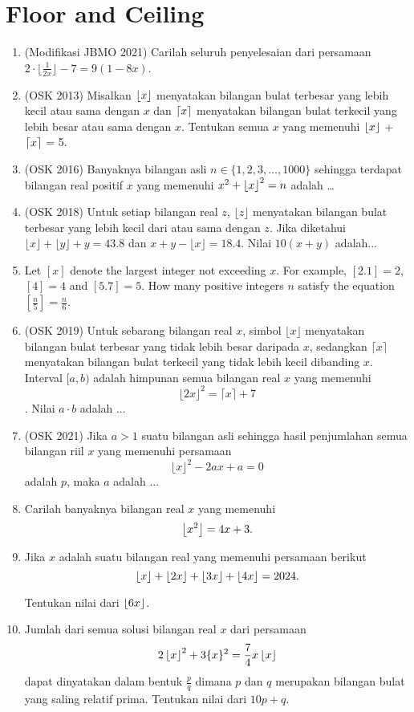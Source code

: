 \documentclass[11pt]{scrartcl}
\begin{document}
\section{Floor and Ceiling}
\begin{enumerate}
    \item (Modifikasi JBMO 2021) Carilah seluruh penyelesaian dari persamaan $2\cdot \lfloor{\frac{1}{2x}}\rfloor - 7 = 9(1 - 8x)$.

    \item (OSK 2013) Misalkan $\left\lfloor x \right\rfloor$ menyatakan bilangan bulat terbesar yang lebih kecil atau sama dengan $x$ dan $\left\lceil x \right\rceil$ menyatakan bilangan bulat terkecil yang lebih besar atau sama dengan $x$. Tentukan semua $x$ yang memenuhi $\left\lfloor x \right\rfloor$ + $\left\lceil x \right\rceil$ = 5.
    
    \item (OSK 2016) Banyaknya bilangan asli $n \in \{1,2,3,\dots,1000\}$ sehingga terdapat bilangan real positif $x$ yang memenuhi $x^2+\left\lfloor x \right\rfloor^2=n$ adalah \dots
    
    \item (OSK 2018) Untuk setiap bilangan real $z$, $\lfloor z \rfloor$ menyatakan bilangan bulat terbesar yang lebih kecil dari atau sama dengan $z$. Jika diketahui $\lfloor x \rfloor + \lfloor y \rfloor + y = 43.8$ dan $x + y - \lfloor x \rfloor = 18.4$. Nilai $10(x + y)$ adalah...
    
    \item Let $[x]$ denote the largest integer not exceeding $x$. For example, $[2.1]=2$, $[4]=4$ and $[5.7]=5$. How many positive integers $n$ satisfy the equation $\left[\frac{n}{5}\right]=\frac{n}{6}$.

    \item (OSK 2019) Untuk sebarang bilangan real $x$, simbol $\lfloor x \rfloor$ menyatakan bilangan bulat terbesar yang tidak lebih besar daripada $x$, sedangkan $\lceil x \rceil$ menyatakan bilangan bulat terkecil yang tidak lebih kecil dibanding $x$. Interval $[a, b)$ adalah himpunan semua bilangan real $x$ yang memenuhi
    $$\lfloor 2x \rfloor^2 = \lceil x \rceil + 7$$.
    Nilai $a \cdot b$ adalah ...

    \item (OSK 2021) Jika $a > 1$ suatu bilangan asli sehingga hasil penjumlahan semua bilangan riil $x$ yang memenuhi persamaan
    $$\lfloor x \rfloor^2 - 2ax + a = 0$$
    adalah $p$, maka $a$ adalah ...

    \item Carilah banyaknya bilangan real $x$ yang memenuhi
    $$\left\lfloor x^2 \right\rfloor=4x+3.$$

    \item Jika $x$ adalah suatu bilangan real yang memenuhi persamaan berikut
    $$\left\lfloor x \right\rfloor+\left\lfloor 2x \right\rfloor+\left\lfloor 3x \right\rfloor+\left\lfloor 4x \right\rfloor=2024.$$

    Tentukan nilai dari $\left\lfloor 6x \right\rfloor$.

    \item Jumlah dari semua solusi bilangan real $x$ dari persamaan
    $$2\left\lfloor x \right\rfloor^2+3\{x\}^2=\frac{7}{4}x\left\lfloor x \right\rfloor$$
    dapat dinyatakan dalam bentuk $\frac{p}{q}$ dimana $p$ dan $q$ merupakan bilangan bulat yang saling relatif prima. Tentukan nilai dari $10p+q$.
\end{enumerate}
\end{document}
